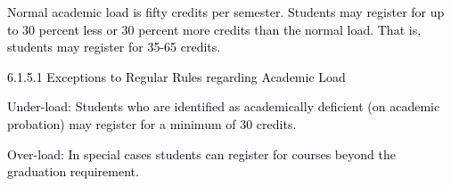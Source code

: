 \documentclass[12pt]{article}
\begin{document}
\vspace{\baselineskip}
\begin{justify}
{\fontsize{10pt}{12.0pt}\selectfont \textcolor[HTML]{00000A}{Normal academic load is fifty credits per semester. Students may register for up to 30 percent less or 30 percent more credits than the normal load. That is, students may register for 35-65 credits.}\par}
\end{justify}\par


\vspace{\baselineskip}
{\fontsize{10pt}{12.0pt}\selectfont \textcolor[HTML]{00000A}{6.1.5.1 Exceptions to Regular Rules regarding Academic Load}\par}\par


\vspace{\baselineskip}
\begin{adjustwidth}{0.0in}{0.01in}
\begin{justify}
{\fontsize{10pt}{12.0pt}\selectfont \textcolor[HTML]{00000A}{Under-load: Students who are identified as academically deficient (on academic probation) may register for a minimum of 30 credits.}\par}
\end{justify}\par

\end{adjustwidth}


\vspace{\baselineskip}
{\fontsize{10pt}{12.0pt}\selectfont \textcolor[HTML]{00000A}{Over-load: In special cases students can register for courses beyond the graduation requirement.}\par}\par
\end{document}
